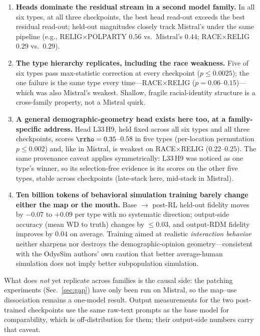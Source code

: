 \begin{enumerate}
  \item \textbf{Heads dominate the residual stream in a second model
        family.} In all six types, at all three checkpoints, the best
        head read-out exceeds the best residual read-out; held-out
        magnitudes closely track Mistral's under the same pipeline
        (e.g., RELIG$\times$POLPARTY $0.56$ vs.\ Mistral's $0.44$;
        RACE$\times$RELIG $0.29$ vs.\ $0.29$).
  \item \textbf{The type hierarchy replicates, including the race
        weakness.} Five of six types pass max-statistic correction at
        every checkpoint ($p\le0.0025$); the one failure is the same
        type every time---RACE$\times$RELIG ($p=0.06$--$0.15$)---which
        was also Mistral's weakest. Shallow, fragile racial-identity
        structure is a cross-family property, not a Mistral quirk.
  \item \textbf{A general demographic-geometry head exists here too, at
        a family-specific address.} Head L33\,H9, held fixed across all
        six types and all three checkpoints, scores $\rrho=0.35$--$0.58$
        in five types (per-location permutation $p\le0.002$) and, like
        \starhead{} in Mistral, is weakest on RACE$\times$RELIG
        ($0.22$--$0.25$). The same provenance caveat
        applies symmetrically: L33\,H9 was noticed as one type's winner,
        so its selection-free evidence is its scores on the other five
        types, stable across checkpoints (late-stack here, mid-stack in
        Mistral).
  \item \textbf{Ten billion tokens of behavioral simulation training
        barely change either the map or the mouth.} Base $\to$ post-RL
        held-out fidelity moves by $-0.07$ to $+0.09$ per type with no
        systematic direction; output-side accuracy (mean WD to truth)
        changes by $\le0.03$, and output-RDM fidelity improves by $0.04$
        on average. Training aimed at realistic \emph{interaction
        behavior} neither sharpens nor destroys the demographic-opinion
        geometry---consistent with the OdysSim authors' own caution that
        better average-human simulation does not imply better
        subpopulation simulation.
\end{enumerate}

What does \emph{not} yet replicate across families is the causal side:
the patching experiments (Sec.~\ref{sec:gap}) have only been run on
Mistral, so the map--use dissociation remains a one-model result. Output
measurements for the two post-trained checkpoints use the same raw-text
prompts as the base model for comparability, which is off-distribution
for them; their output-side numbers carry that caveat.
